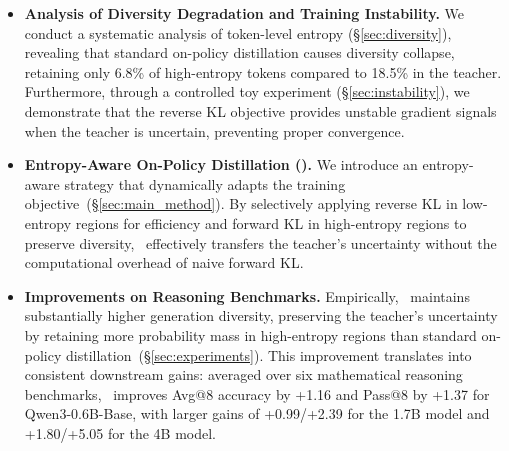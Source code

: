 \begin{itemize}[leftmargin=1.2em, itemsep=1mm, topsep=1pt]
    \item \textbf{Analysis of Diversity Degradation and Training Instability.}
    We conduct a systematic analysis of token-level entropy (\S\ref{sec:diversity}), revealing that standard on-policy distillation causes diversity collapse, retaining only 6.8\% of high-entropy tokens compared to 18.5\% in the teacher. Furthermore, through a controlled toy experiment (\S\ref{sec:instability}), we demonstrate that the reverse KL objective provides unstable gradient signals when the teacher is uncertain, preventing proper convergence.

    \item \textbf{Entropy-Aware On-Policy Distillation (\method).} We introduce an entropy-aware strategy that dynamically adapts the training objective~(\S\ref{sec:main_method}). By selectively applying reverse KL in low-entropy regions for efficiency and forward KL in high-entropy regions to preserve diversity, \method~effectively transfers the teacher's uncertainty without the computational overhead of naive forward KL.

    \item \textbf{Improvements on Reasoning Benchmarks.} Empirically, \method~maintains substantially higher generation diversity, preserving the teacher's uncertainty by retaining more probability mass in high-entropy regions than standard on-policy distillation~(\S\ref{sec:experiments}). This improvement translates into consistent downstream gains: averaged over six mathematical reasoning benchmarks, \method~improves Avg@8 accuracy by +1.16 and Pass@8 by +1.37 for Qwen3-0.6B-Base, with larger gains of +0.99/+2.39 for the 1.7B model and +1.80/+5.05 for the 4B model.
\end{itemize}



